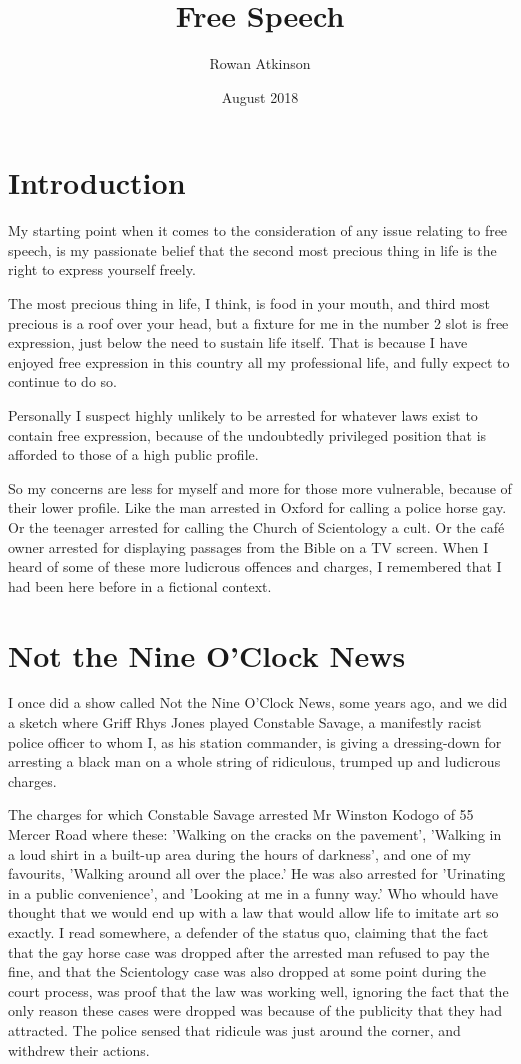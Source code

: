 \documentclass[11pt, a4paper]{article}
\title{Free Speech}
\author{Rowan Atkinson}
\date{August 2018}
\begin{document}
\maketitle

\section{Introduction}
My starting point when it comes to the consideration of any issue relating to free speech, is my passionate belief that the second most precious thing in life is the right to express yourself freely.

The most precious thing in life, I think, is food in your mouth, and third most precious is a roof over your head, but a fixture for me in the number 2 slot is free expression, just below the need to sustain life itself.
That is because I have enjoyed free expression in this country all my professional life, and fully expect to continue to do so.

Personally I suspect highly unlikely to be arrested for whatever laws exist to contain free expression, because of the undoubtedly privileged position that is afforded to those of a high public profile.

So my concerns are less for myself and more for those more vulnerable, because of their lower profile.
Like the man arrested in Oxford for calling a police horse gay. Or the teenager arrested for calling the Church of Scientology a cult. Or the café owner arrested for displaying passages from the Bible on a TV screen.
When I heard of some of these more ludicrous offences and charges, I remembered that I had been here before in a fictional context.

\section{Not the Nine O'Clock News}
I once did a show called Not the Nine O'Clock News, some years ago, and we did a sketch where Griff Rhys Jones played Constable Savage, a manifestly racist police officer to whom I, as his station commander, is giving a dressing-down for arresting a black man on a whole string of ridiculous, trumped up and ludicrous charges.

The charges for which Constable Savage arrested Mr Winston Kodogo of 55 Mercer Road where these: 'Walking on the cracks on the pavement', 'Walking in a loud shirt in a built-up area during the hours of darkness', and one of my favourits, 'Walking around all over the place.'
He was also arrested for 'Urinating in a public convenience', and 'Looking at me in a funny way.' Who whould have thought that we would end up with a law that would allow life to imitate art so exactly.
I read somewhere, a defender of the status quo, claiming that the fact that the gay horse case was dropped after the arrested man refused to pay the fine, and that the Scientology case was also dropped at some point during the court process, was proof that the law was working well, ignoring the fact that the only reason these cases were dropped was because of the publicity that they had attracted.
The police sensed that ridicule was just around the corner, and withdrew their actions.
\end{document}
